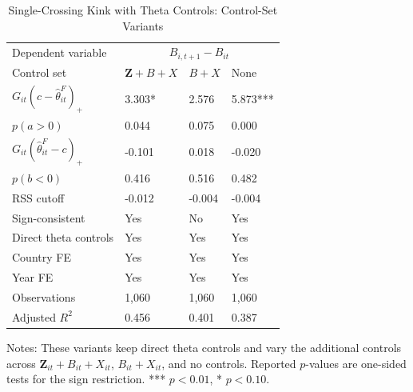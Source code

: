 \begin{table}[H]\centering
\caption{Single-Crossing Kink with Theta Controls: Control-Set Variants}
\label{tab:app_kink_withtheta_controls}
\begin{threeparttable}
\scriptsize
\setlength{\tabcolsep}{3.0pt}
\begin{tabularx}{0.92\textwidth}{lYYY}
\toprule
Dependent variable &  \\
Control set & $\mathbf{Z}+B+X$ & $B+X$ & None \\
\midrule
$G_{it}(c-\widehat\theta^F_{it})_+$ & 3.303* & 2.576 & 5.873*** \\
$p(a>0)$ & 0.044 & 0.075 & 0.000 \\
$G_{it}(\widehat\theta^F_{it}-c)_+$ & -0.101 & 0.018 & -0.020 \\
$p(b<0)$ & 0.416 & 0.516 & 0.482 \\
\midrule
RSS cutoff & -0.012 & -0.004 & -0.004 \\
Sign-consistent & Yes & No & Yes \\
Direct theta controls & Yes & Yes & Yes \\
Country FE & Yes & Yes & Yes \\
Year FE & Yes & Yes & Yes \\
Observations & 1,060 & 1,060 & 1,060 \\
Adjusted $R^2$ & 0.456 & 0.401 & 0.387 \\
\bottomrule
\end{tabularx}
\begin{tablenotes}[flushleft]\footnotesize
\item Notes: These variants keep direct theta controls and vary the additional controls across $\mathbf{Z}_{it}+B_{it}+X_{it}$, $B_{it}+X_{it}$, and no controls. Reported $p$-values are one-sided tests for the sign restriction. *** $p<0.01$, * $p<0.10$.
\end{tablenotes}
\end{threeparttable}
\end{table}
